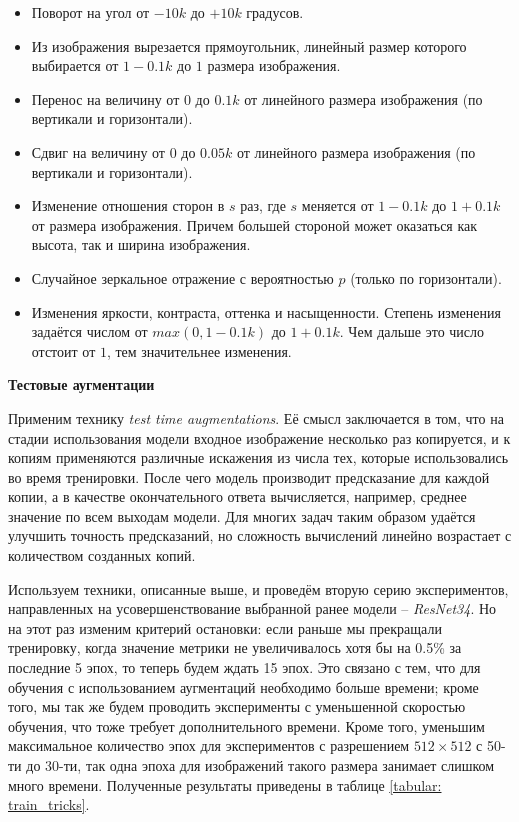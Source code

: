 \begin{itemize}

    \item Поворот на угол от $-10k$ до $+10k$ градусов.

    \item Из изображения вырезается прямоугольник, линейный размер
    которого выбирается от $1 - 0.1k$ до $1$ размера изображения.
    
    \item Перенос на величину от $0$ до $0.1k$ от линейного
    размера изображения (по вертикали и горизонтали).
    
    \item Сдвиг на величину от $0$ до $0.05k$ от линейного
    размера изображения
    (по вертикали и горизонтали).
    
    \item Изменение отношения сторон в $s$ раз, где $s$ меняется
    от $1 - 0.1k$ до $1 + 0.1k$ от размера изображения.
    Причем большей стороной может оказаться как высота,
    так и ширина изображения.
    
    \item Случайное зеркальное отражение с вероятностью $p$
    (только по горизонтали).
    
    \item Изменения яркости, контраста, оттенка и насыщенности.
    Степень изменения задаётся числом от
    $max(0, 1 - 0.1k)$ до $1 + 0.1k$. Чем дальше это число отстоит от
    $1$, тем значительнее изменения.
    
\end{itemize}
    
    
\indent
\indent
\textbf{Тестовые аугментации}

\indent
Применим технику \textit{test time augmentations}.
Её смысл заключается в том, что на стадии использования модели
входное изображение
несколько раз копируется, и к копиям применяются различные 
искажения из числа тех, которые использовались во время тренировки.
После чего модель производит предсказание для каждой
копии, а в качестве окончательного ответа вычисляется, например, 
среднее значение по всем выходам модели. Для многих задач таким образом
удаётся улучшить точность предсказаний,
но сложность вычислений линейно возрастает
с количеством созданных копий.


\bigbreak
\indent
\indent
Используем техники, описанные выше, и проведём вторую серию 
экспериментов, направленных на усовершенствование
 выбранной ранее модели --
\textit{ResNet34}. Но на этот раз изменим критерий остановки: если раньше мы 
прекращали тренировку, когда значение метрики не увеличивалось хотя бы 
на 0.5\% за последние 5 эпох, то теперь будем ждать 15 эпох. Это связано
с тем, что для обучения с использованием аугментаций необходимо
больше времени; кроме того, мы так же будем
проводить эксперименты с уменьшенной
скоростью обучения, что тоже требует дополнительного времени.
Кроме того, уменьшим максимальное количество эпох для экспериментов
с разрешением $512 \times 512$ с 50-ти до 30-ти, так одна эпоха 
для изображений такого размера занимает слишком много времени.
Полученные результаты приведены в таблице \ref{tabular: train_tricks}.



